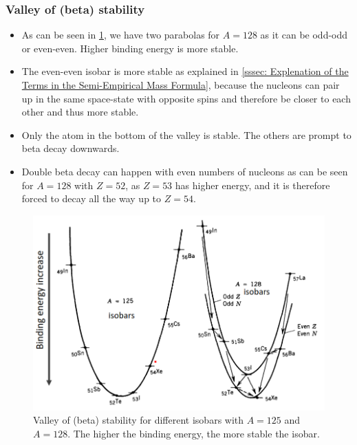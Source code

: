 \documentclass{article}
\begin{document}
\subsubsection{Valley of (beta) stability}
\begin{itemize}
    \item As can be seen in \cref{fig: valley_beta_stability}, we have two parabolas for $A = 128$ as it can be odd-odd or even-even. Higher binding energy is more stable.
    \item The even-even isobar is more stable as explained in \cref{sssec: Explenation of the Terms in the Semi-Empirical Mass Formula}, because the nucleons can pair up in the same space-state with opposite spins and therefore be closer to each other and thus more stable.
    \item Only the atom in the bottom of the valley is stable. The others are prompt to beta decay downwards. 
    \item Double beta decay can happen with even numbers of nucleons as can be seen for $A = 128$ with $Z = 52$, as $Z = 53$ has higher energy, and it is therefore forced to decay all the way up to $Z = 54$. 
\end{itemize}
\begin{figure}[h!]
\centering
\includegraphics[width = .6\textwidth]{valley_beta_stability.png}
\caption{Valley of (beta) stability for different isobars with $A = 125$ and $A = 128$. The higher the binding energy, the more stable the isobar.}
\label{fig: valley_beta_stability}
\end{figure}
\end{document}
